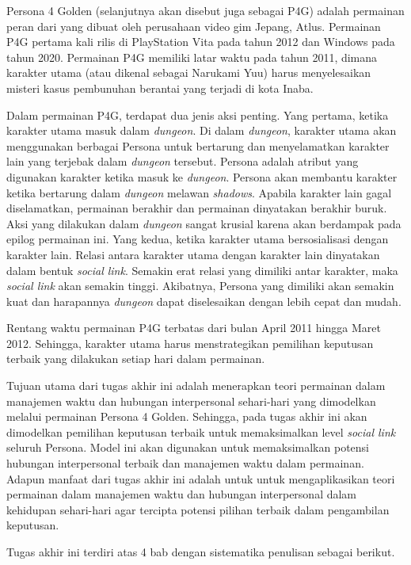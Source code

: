 Persona 4 Golden (selanjutnya akan disebut juga sebagai P4G) adalah permainan peran dari yang dibuat oleh perusahaan video gim Jepang, Atlus. Permainan P4G pertama kali rilis di PlayStation Vita pada tahun 2012 dan Windows pada tahun 2020. Permainan P4G memiliki latar waktu pada tahun 2011, dimana karakter utama (atau dikenal sebagai Narukami Yuu) harus menyelesaikan misteri kasus pembunuhan berantai yang terjadi di kota Inaba.

Dalam permainan P4G, terdapat dua jenis aksi penting. Yang pertama, ketika karakter utama masuk dalam \textit{dungeon}. Di dalam \textit{dungeon}, karakter utama akan menggunakan berbagai Persona untuk bertarung dan menyelamatkan karakter lain yang terjebak dalam \textit{dungeon} tersebut. Persona adalah atribut yang digunakan karakter ketika masuk ke \textit{dungeon}. Persona akan membantu karakter ketika bertarung dalam \textit{dungeon} melawan \textit{shadows}. Apabila karakter lain gagal diselamatkan, permainan berakhir dan permainan dinyatakan berakhir buruk. Aksi yang dilakukan dalam \textit{dungeon} sangat krusial karena akan berdampak pada epilog permainan ini. Yang kedua, ketika karakter utama bersosialisasi dengan karakter lain. Relasi antara karakter utama dengan karakter lain dinyatakan dalam bentuk \textit{social link}. Semakin erat relasi yang dimiliki antar karakter, maka \textit{social link} akan semakin tinggi. Akibatnya, Persona yang dimiliki akan semakin kuat dan harapannya \textit{dungeon} dapat diselesaikan dengan lebih cepat dan mudah.

Rentang waktu permainan P4G terbatas dari bulan April 2011 hingga Maret 2012. Sehingga, karakter utama harus menstrategikan pemilihan keputusan terbaik yang dilakukan setiap hari dalam permainan.

Tujuan utama dari tugas akhir ini adalah menerapkan teori permainan dalam manajemen waktu dan hubungan interpersonal sehari-hari yang dimodelkan melalui permainan Persona 4 Golden. Sehingga, pada tugas akhir ini akan dimodelkan pemilihan keputusan terbaik untuk memaksimalkan level \textit{social link} seluruh Persona. Model ini akan digunakan untuk memaksimalkan potensi hubungan interpersonal terbaik dan manajemen waktu dalam permainan. Adapun manfaat dari tugas akhir ini adalah untuk untuk mengaplikasikan teori permainan dalam manajemen waktu dan hubungan interpersonal dalam kehidupan sehari-hari agar tercipta potensi pilihan terbaik dalam pengambilan keputusan.

Tugas akhir ini terdiri atas 4 bab dengan sistematika penulisan sebagai berikut.

